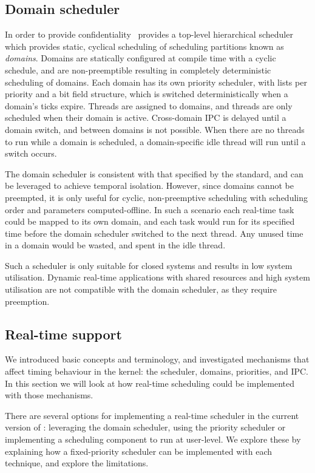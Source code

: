 \subsection{Domain scheduler}
\label{sec:sel4-domain-scheduler}

In order to provide confidentiality~\citep{Murray_MBGBSLGK_13} \selfour provides a top-level hierarchical scheduler
which provides static, cyclical scheduling of scheduling partitions known as \emph{domains}. 
Domains are statically configured at compile time with a cyclic schedule, and are non-preemptible
resulting in completely deterministic scheduling of domains.
Each domain has its own priority scheduler, with lists per priority and a bit field structure, which is switched deterministically when a domain's
ticks expire. 
Threads are assigned to domains, and threads are only scheduled when their domain is active.
Cross-domain \gls{IPC} is delayed until a domain switch, and \yield between domains is not
possible. When there are no threads to run while a domain is scheduled, a domain-specific idle thread will run until a switch occurs.

The domain scheduler is consistent with that specified by the \citet{ARINC653} standard, and 
can be leveraged to achieve temporal isolation. However, since domains cannot be
preempted, it is only useful for cyclic, non-preemptive scheduling with scheduling order and
parameters computed-offline.
In such a scenario each real-time task could be mapped to its own domain, and each task would run for its specified time before the domain scheduler switched to the next thread.
Any unused time in a domain would be wasted, and spent in the idle thread.

Such a scheduler is only suitable for closed systems and results in low system utilisation.
Dynamic real-time applications with shared resources and high system utilisation are not compatible
with the domain scheduler, as they require preemption.

\subsection{Real-time support}

We introduced basic \selfour concepts and terminology, and investigated mechanisms that affect
timing behaviour in the kernel: the scheduler, domains, priorities, \yield and IPC. 
In this section we will look at how real-time scheduling could be implemented with those mechanisms.

There are several options for implementing a real-time scheduler in the current version of \selfour:
leveraging the domain scheduler, using the priority scheduler or implementing a scheduling component
to run at user-level. We explore these by explaining how a fixed-priority scheduler can be
implemented with each technique, and explore the limitations. 

